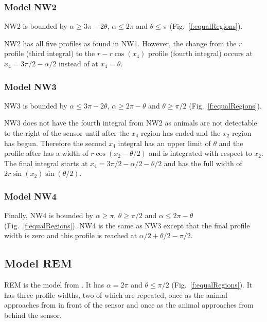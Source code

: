 \subsubsection{Model NW2} \label{NW2}

NW2 is bounded by $\alpha \ge 3\pi - 2\theta$, $\alpha \le 2\pi$ and $\theta\le\pi$ (Fig.~\ref{f:equalRegions}).

NW2 has all five profiles as found in NW1. However, the change from the $r$ profile (third integral) to the $r - r\cos(x_4)$ profile (fourth integral) occurs at $x_4 = 3\pi/2 - \alpha/2$ instead of at $x_4 = \theta$. 




\subsubsection{Model NW3} \label{NW3}

NW3 is bounded by $\alpha \le 3\pi - 2\theta$, $\alpha\ge 2\pi-\theta$ and $\theta\ge\pi/2$ (Fig.~\ref{f:equalRegions}).

NW3 does not have the fourth integral from NW2 as animals are not detectable to the right of the sensor until after the $x_4$ region has ended and the $x_2$ region has begun. Therefore the second $x_4$ integral has an upper limit of $\theta $ and the profile after has a width of $r\cos(x_2 - \theta/2)$ and is integrated with respect to $x_2$. The final integral starts at $x_4 = 3\pi/2 - \alpha/2 - \theta/2$ and has the full width of $2r\sin(x_2)\sin(\theta/2)$.



\subsubsection{Model NW4} \label{NW4}

Finally, NW4 is bounded by $\alpha\ge \pi$, $\theta\ge \pi/2$ and $\alpha \le 2\pi - \theta$ (Fig.~\ref{f:equalRegions}). NW4 is the same as NW3 except that the final profile width is zero and this profile is reached at $\alpha/2+\theta/2-\pi/2$. 




\subsection{Model REM} \label{REM}

REM is the model from \cite{rowcliffe2008estimating}. It has $\alpha =2\pi$ and $\theta \le \pi/2$ (Fig.~\ref{f:equalRegions}). It has three profile widths, two of which are repeated, once as the animal approaches from in front of the sensor and once as the animal approaches from behind the sensor.

